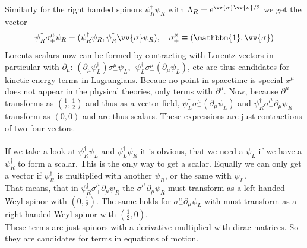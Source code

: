 \documentclass{include/thesisclass}
\newcommand{\ehm}{\mathbbm{1}}
\newcommand{\p}{\partial}
\begin{document}
Similarly for the right handed spinors $\psi_R^\dagger \psi_R$ with $\Lambda_R = e^{\vv{\sigma}\vv{\nu}/2}$ we get the vector
\[ \psi_R^\dagger \sigma_+^\mu \psi_R = ( \psi_R^\dagger \psi_R, \psi_R^\dagger \vv{\sigma} \psi_R), ~~~ \sigma_+^\mu \equiv (\ehm, \vv{\sigma})\]
Lorentz scalars now can be formed by contracting with Lorentz vectors in particular with $\p_\mu$: $( \p_\mu \psi_L^\dagger) \sigma_-^\mu \psi_L,~~ \psi_L^\dagger \sigma_-^\mu ( \p_\mu \psi_L) $, etc are thus candidates for kinetic energy terms in Lagrangians. Becaue no point in spacetime is special $x^\mu$ does not appear in the physical theories, only terms with $\p^\mu$. Now, because $\p^\mu$ transforms as $\left(\frac{1}{2}, \frac{1}{2}\right)$ and thus as a vector field, $\psi^\dagger_L \sigma_-^\mu ( \p_\mu\psi_L)$ and $\psi_R^\dagger \sigma_+^\mu \p_\mu \psi_R$ transform as $(0,0)$ and are thus scalars. These expressions are just contractions of two four vectors.\\
\\
If we take a look at $\psi_R^\dagger\psi_L$ and $\psi^\dagger_L\psi_R$ it is obvious, that we need a $\psi_L$ if we have a $\psi_R^\dagger$ to form a scalar. This is the only way to get a scalar. Equally we can only get a vector if $\psi_R^\dagger$ is multiplied with another $\psi_R$, or the same with $\psi_L$.\\
That means, that in $\psi^\dagger_R \sigma_+^\mu \p_\mu \psi_R$ the $\sigma_+^\mu\p_\mu \psi_R$ must transform as a left handed Weyl spinor with $\left( 0,\frac{1}{2}\right)$. The same holds for $\sigma_-^\mu\p_\mu\psi_L$ with must transform as a right handed Weyl spinor with $\left( \frac{1}{2},0\right)$.\\
These terms are just spinors with a derivative multiplied with dirac matrices. So they are candidates for terms in equations of motion.
\end{document}
